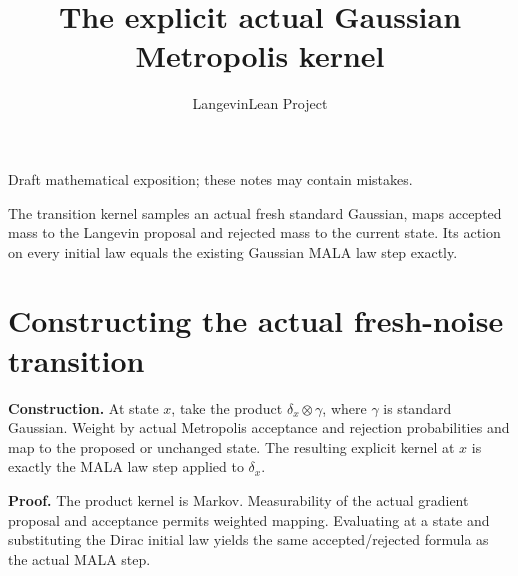 \documentclass[11pt,a4paper]{article}
\title{\texorpdfstring{The explicit actual Gaussian Metropolis kernel}{The explicit actual Gaussian Metropolis kernel}}
\author{LangevinLean Project}
\date{}
\begin{document}
\maketitle
Draft mathematical exposition; these notes may contain mistakes.


The transition kernel samples an actual fresh standard Gaussian, maps accepted mass to the Langevin proposal and rejected mass to the current state. Its action on every initial law equals the existing Gaussian MALA law step exactly.


\section{\texorpdfstring{Constructing the actual fresh-noise transition}{Constructing the actual fresh-noise transition}}


\textbf{Construction.} At state \(x\), take the product \(\delta_x\otimes\gamma\), where \(\gamma\) is standard Gaussian. Weight by actual Metropolis acceptance and rejection probabilities and map to the proposed or unchanged state. The resulting explicit kernel at \(x\) is exactly the MALA law step applied to \(\delta_x\).



\textbf{Proof.} The product kernel is Markov. Measurability of the actual gradient proposal and acceptance permits weighted mapping. Evaluating at a state and substituting the Dirac initial law yields the same accepted/\allowbreak{}rejected formula as the actual MALA step.
\end{document}
